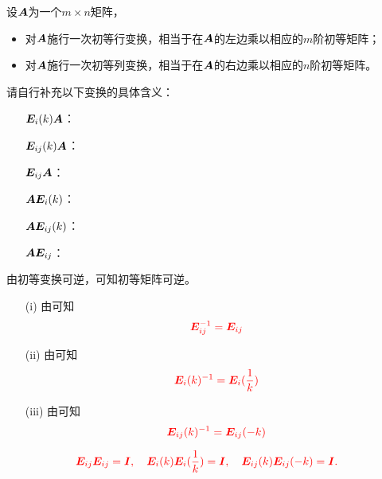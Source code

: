 \begin{dingli}
  设$\A$为一个$m\times n$矩阵，
  \begin{itemize}
  \item 
    对$\A$施行一次初等行变换，相当于在$\A$的左边乘以相应的$m$阶初等矩阵；
  \item
    对$\A$施行一次初等列变换，相当于在$\A$的右边乘以相应的$n$阶初等矩阵。
  \end{itemize}
\end{dingli}

\begin{lianxi}
  请自行补充以下变换的具体含义：
  \begin{itemize}
  \item[] $\E_i(k)\A$：
  \item[] $\E_{ij}(k)\A$：
  \item[] $\E_{ij}\A$：
  \item[] $\A\E_i(k)$：
  \item[] $\A\E_{ij}(k)$：
  \item[] $\A\E_{ij}$：
  \end{itemize}
\end{lianxi}


由初等变换可逆，可知初等矩阵可逆。  
\begin{itemize}
\item[(i)] 由可知
  $$
  \red{\E_{ij}^{-1} = \E_{ij}}
  $$ 
\item[(ii)] 由可知
  $$
  \red{\E_{i}(k)^{-1} = \E_{i}(\frac1k)}
  $$ 
\item[(iii)] 由可知
  $$
  \red{\E_{ij}(k)^{-1} = \E_{ij}(-k)}
  $$ 
\end{itemize}

  $$ \red{
    \E_{ij}\E_{ij}=\II, \quad
    \E_{i}(k)\E_{i}(\frac1k) = \II, \quad
    \E_{ij}(k)\E_{ij}(-k) = \II.
  }
  $$      


